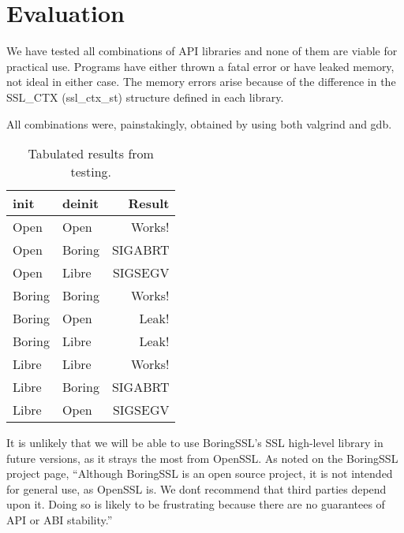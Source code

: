 \documentclass[12pt,oneside]{report}
\begin{document}
\cleardoublepage

\chapter{Evaluation}
\label{sec:eval}

We have tested all combinations of API libraries and none of them are
viable for practical use. Programs have either thrown a fatal error or have
leaked memory, not ideal in either case. The memory errors arise because of the
difference in the SSL\_CTX (ssl\_ctx\_st) structure defined in each library.

All combinations were, painstakingly, obtained by using both valgrind and gdb.

\begin{table}[h!]
	\begin{center}
		\begin{tabular}{ l | l | r }
			\textbf{init}       & \textbf{deinit} & \textbf{Result} \\
			\hline
			Open                & Open            & Works! \\
			Open                & Boring          & SIGABRT \\
			Open                & Libre           & SIGSEGV \\
			\rowcolor{gray!25}
			Boring              & Boring          & Works! \\
			\rowcolor{gray!25}
			Boring              & Open            & Leak! \\
			\rowcolor{gray!25}
			Boring              & Libre           & Leak! \\
			\rowcolor{gray!50}
			Libre               & Libre           & Works! \\
			\rowcolor{gray!50}
			Libre               & Boring          & SIGABRT \\
			\rowcolor{gray!50}
			Libre               & Open            & SIGSEGV \\
		\end{tabular}
		\caption{Tabulated results from testing.}
	\end{center}
\end{table}

It is unlikely that we will be able to use BoringSSL's SSL high-level
library in future versions, as it strays the most from OpenSSL. As noted
on the BoringSSL project page, ``Although BoringSSL is an open source project,
it is not intended for general use, as OpenSSL is. We don\'t recommend that
third parties depend upon it. Doing so is likely to be frustrating because there
are no guarantees of API or ABI stability.''\cite{website:boringssl}
\end{document}
